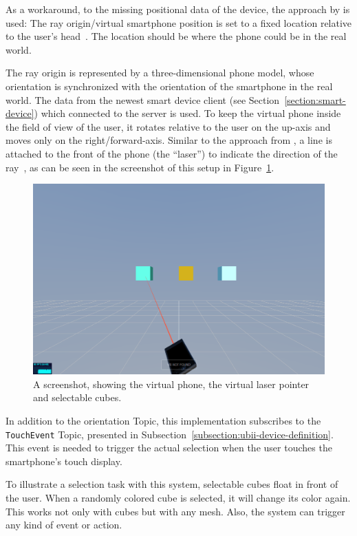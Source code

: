 As a workaround, to the missing positional data of the device, the approach by \citeauthor{Pietroszek.2014} is used: The ray origin/virtual smartphone position is set to a fixed location relative to the user's head~\cite[Figure 3]{Pietroszek.2014}. The location should be where the phone could be in the real world.

The ray origin is represented by a three-dimensional phone model, whose orientation is synchronized with the orientation of the smartphone in the real world. The data from the newest smart device client (see Section~\ref{section:smart-device}) which connected to the server is used. To keep the virtual phone inside the field of view of the user, it rotates relative to the user on the up-axis and moves only on the right/forward-axis.
Similar to the approach from \citeauthor{Steed.2013}, a line is attached to the front of the phone (the \enquote{laser}) to indicate the direction of the ray~\cite[46]{Steed.2013}, as can be seen in the screenshot of this setup in Figure~\ref{fig:screenshot-exp-lp}.

\begin{figure}[H]
	\centering
	\includegraphics[width=12cm]{figures/implementation/screenshot_exp_lp.png}
	\caption[Screenshot of the laser pointer]{A screenshot, showing the virtual phone, the virtual laser pointer and selectable cubes.}\label{fig:screenshot-exp-lp}
\end{figure}

In addition to the orientation Topic, this implementation subscribes to the \lstinline{TouchEvent} Topic, presented in Subsection~\ref{subsection:ubii-device-definition}. This event is needed to trigger the actual selection when the user touches the smartphone's touch display.

To illustrate a selection task with this system, selectable cubes float in front of the user. 
When a randomly colored cube is selected, it will change its color again. This works not only with cubes but with any mesh. Also, the system can trigger any kind of event or action.


